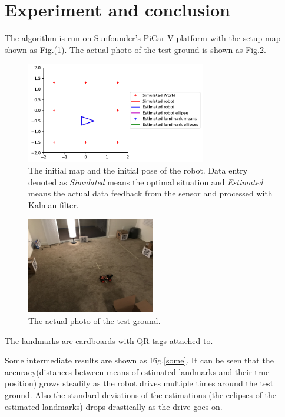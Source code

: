\documentclass[12pt]{article}
\begin{document}
\section{Experiment and conclusion}
The algorithm is run on Sunfounder's PiCar-V platform with the setup map shown as Fig.(\ref{setup}).  The actual photo of the test ground is shown as Fig.{\ref{ph}}.
\begin{figure}[htbp]
\centering
\includegraphics[width=0.7\textwidth]{./figs/20180514-044756/setup.pdf}
\caption{The initial map and the initial pose of the robot. Data entry denoted as \textit{Simulated} means the optimal situation and \textit{Estimated} means the actual data feedback from the sensor and processed with Kalman filter.}\label{setup}
\end{figure}
\begin{figure}[htbp]
\centering
\includegraphics[width=0.5\textwidth]{./figs/pg.JPG}
\caption{The actual photo of the test ground. }\label{ph}
\end{figure}
The landmarks are cardboards with QR tags attached to. 

Some intermediate results are shown as Fig.{\ref{some}}. It can be seen that the accuracy(distances between means of estimated landmarks and their true position) grows steadily as the robot drives multiple times around the test ground. Also the standard deviations of the estimations (the eclipses of the estimated landmarks) drops drastically as the drive goes on.
\end{document}
